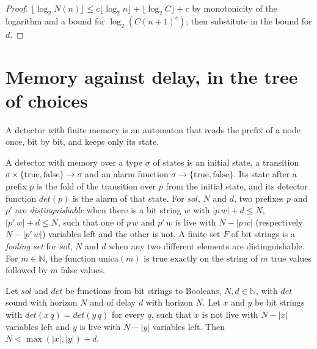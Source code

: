 \begin{proof}
  \leanok
  $\lfloor \log_2 N(n) \rfloor \le c \lfloor \log_2 n \rfloor + \lfloor \log_2 C \rfloor + c$ by
  monotonicity of the logarithm and a bound for $\log_2 (C(n+1)^c)$; then substitute in the
  bound for $d$.
\end{proof}

\section{Memory against delay, in the tree of choices}
\label{sec:search-memory-delay}

A detector with finite memory is an automaton that reads the prefix of a node once, bit by bit,
and keeps only its state.

\begin{definition}
  \label{def:search-memoria}
  \leanok
  A detector with memory over a type $\sigma$ of states is an initial state, a transition
  $\sigma \times \{\mathrm{true}, \mathrm{false}\} \to \sigma$ and an alarm function
  $\sigma \to \{\mathrm{true}, \mathrm{false}\}$. Its state after a prefix $p$ is the fold of the
  transition over $p$ from the initial state, and its detector function $\mathit{det}(p)$ is the
  alarm of that state. For $\mathit{sol}$, $N$ and $d$, two prefixes $p$ and $p'$ are
  \emph{distinguishable} when there is a bit string $w$ with $|p\,w| + d \le N$, $|p'\,w| + d \le N$,
  such that one of $p\,w$ and $p'\,w$ is live with $N - |p\,w|$ (respectively $N - |p'\,w|$)
  variables left and the other is not. A finite set $F$ of bit strings is a \emph{fooling set} for
  $\mathit{sol}$, $N$ and $d$ when any two different elements are distinguishable. For $m \in
  \mathbb{N}$, the function $\mathrm{unica}(m)$ is true exactly on the string of $m$ true values
  followed by $m$ false values.
  \own{}
\end{definition}

\begin{theorem}
  \label{thm:search-bombeo-demora}
  \leanok
  Let $\mathit{sol}$ and $\mathit{det}$ be functions from bit strings to Booleans, $N, d \in
  \mathbb{N}$, with $\mathit{det}$ sound with horizon $N$ and of delay $d$ with horizon $N$. Let $x$
  and $y$ be bit strings with $\mathit{det}(x\,q) = \mathit{det}(y\,q)$ for every $q$, such that $x$
  is not live with $N - |x|$ variables left and $y$ is live with $N - |y|$ variables left. Then
  $N < \max(|x|, |y|) + d$.
  \own{}
\end{theorem}

